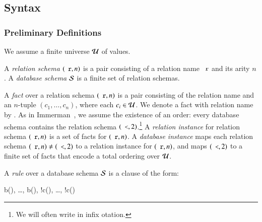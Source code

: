 \subsection{Syntax}

\subsubsection{Preliminary Definitions}


We assume a finite universe $\mathcal{U}$ of values.

A {\em relation schema} $(\dedalus{r},n)$ is a pair consisting of a relation name $\dedalus{r}$ and its arity $n$.
A {\em database schema} $\mathcal{S}$ is a finite set of relation schemas.

A {\em fact} over a relation schema $(\dedalus{r}, n)$ is a pair consisting of
the relation name  and an $n$-tuple $(c_1,\ldots,c_n)$, where each
$c_i \in \mathcal{U}$.  We denote a fact with relation name  by
.  As in Immerman~\cite{immerman-ptime}, we assume
the existence of an order: every database schema contains the relation schema
$(\dedalus{<},2)$.\footnote{We will often write \dedalus{<} in infix otation.} 
A {\em relation instance} for relation schema $(\dedalus{r},n)$ is a set of facts for
$(\dedalus{r},n)$.  A {\em database instance} maps each relation schema $(\dedalus{r},n) \ne
(\dedalus{<},2)$ to a relation instance for $(\dedalus{r},n)$, and maps $(\dedalus{<},2)$ to a
finite set of \dedalus{<} facts that encode a total ordering over $\mathcal{U}$.

A {\em rule} over a database schema $\mathcal{S}$ is a clause of the form:

\begin{Drules}
        {b(), \ldots, b(), !c(), \ldots, !c()}
\end{Drules}

